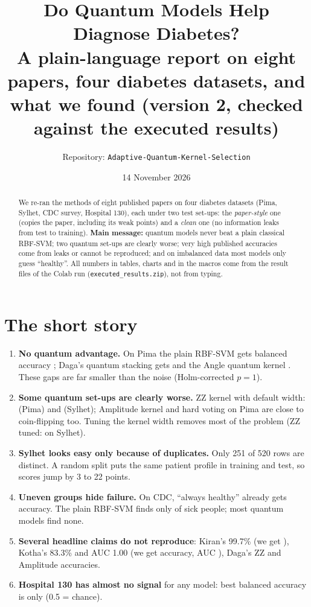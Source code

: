 \documentclass[11pt,a4paper]{article}
\title{\textbf{Do Quantum Models Help Diagnose Diabetes?}\\[0.2em]\large A plain-language report on eight papers, four diabetes datasets, and what we found (version 2, checked against the executed results)}
\author{Repository: \texttt{Adaptive-Quantum-Kernel-Selection}}
\date{14 November 2026}
\begin{document}
\maketitle
\begin{abstract}\noindent
We re-ran the methods of eight published papers on four diabetes datasets (Pima, Sylhet, CDC survey, Hospital 130), each under two test set-ups: the \emph{paper-style} one (copies the paper, including its weak points) and a \emph{clean} one (no information leaks from test to training). \textbf{Main message:} quantum models never beat a plain classical RBF-SVM; two quantum set-ups are clearly worse; very high published accuracies come from leaks or cannot be reproduced; and on imbalanced data most models only guess ``healthy''. All numbers in tables, charts and in the macros come from the result files of the Colab run (\texttt{executed\_results.zip}), not from typing.
\end{abstract}
\tableofcontents\clearpage

\section{The short story}
\begin{enumerate}[leftmargin=1.5em]
\item \textbf{No quantum advantage.} On Pima the plain RBF-SVM gets balanced accuracy \mPimaRBFba; Daga's quantum stacking gets \mPimaStackba and the Angle quantum kernel \mPimaAngleba. These gaps are far smaller than the noise (Holm-corrected $p=1$).
\item \textbf{Some quantum set-ups are clearly worse.} ZZ kernel with default width: \mPimaZZba (Pima) and \mSylZZba (Sylhet); Amplitude kernel and hard voting on Pima are close to coin-flipping too. Tuning the kernel width removes most of the problem (ZZ tuned: \mSylZZtunedba on Sylhet).
\item \textbf{Sylhet looks easy only because of duplicates.} Only 251 of 520 rows are distinct. A random split puts the same patient profile in training and test, so scores jump by 3 to 22 points.
\item \textbf{Uneven groups hide failure.} On CDC, ``always healthy'' already gets \mCdcFloor{} accuracy. The plain RBF-SVM finds only \mCdcRBFrec{} of sick people; most quantum models find none.
\item \textbf{Several headline claims do not reproduce}: Kiran's 99.7\% (we get \mKiranVQCpaperAcc), Kotha's 83.3\% and AUC 1.00 (we get \mKothaPimaCleanAcc{} accuracy, AUC \mKothaPimaAUC), Daga's ZZ and Amplitude accuracies.
\item \textbf{Hospital 130 has almost no signal} for any model: best balanced accuracy is only \mHospBestba{} (0.5 = chance).
\end{enumerate}
\end{document}
